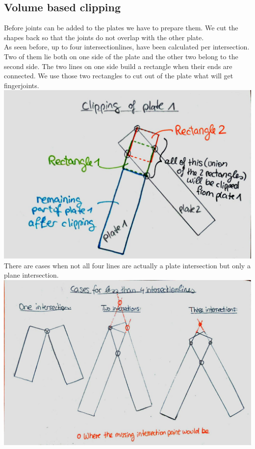 \documentclass[../ClassicThesis.tex]{subfiles}
\begin{document}
\subsection{Volume based clipping}
Before joints can be added to the plates we have to prepare them. We cut the shapes back so that the joints do not overlap with the other plate.\\
As seen before, up to four intersectionlines, have been calculated per intersection.\\
Two of them lie both on one side of the plate and the other two belong to the second side. The two lines on one side build a rectangle when their ends are connected. We use those two rectangles to cut out of the plate what will get fingerjoints.\\
\includegraphics[width=\columnwidth]{Images/10-joints-clippingPlate.jpg}\\
There are cases when not all four lines are actually a plate intersection but only a plane intersection. \\
\includegraphics[width=\columnwidth]{Images/10-joints-casesOfLines.jpg}\\
\end{document}
